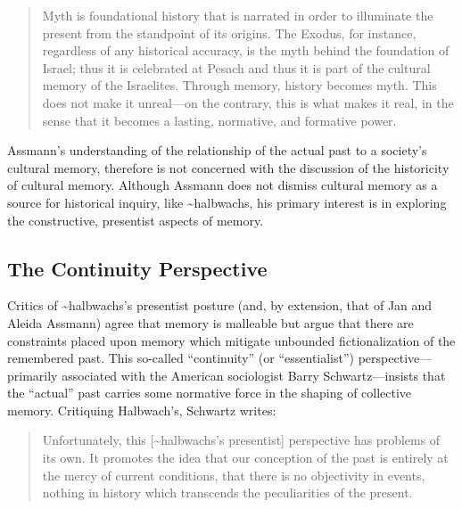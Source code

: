 \begin{quote}
Myth is foundational history that is narrated in order to illuminate the
present from the standpoint of its origins. The Exodus, for instance,
regardless of any historical accuracy, is the myth behind the foundation
of Israel; thus it is celebrated at Pesach and thus it is part of the
cultural memory of the Israelites. Through memory, history becomes myth.
This does not make it unreal---on the contrary, this is what makes it
real, in the sense that it becomes a lasting, normative, and formative
power.\autocite[38]{assmann2011}
\end{quote}

Assmann's understanding of the relationship of the actual past to a
society's cultural memory, therefore is not concerned with the
discussion of the historicity of cultural memory. Although Assmann does
not dismiss cultural memory as a source for historical inquiry, like
\textasciitilde{}halbwachs, his primary interest is in exploring the
constructive, presentist aspects of memory.

\hypertarget{the-continuity-perspective}{%
\subsection{The Continuity
Perspective}\label{the-continuity-perspective}}

Critics of \textasciitilde{}halbwachs's presentist posture (and, by
extension, that of Jan and Aleida Assmann) agree that memory is
malleable but argue that there are constraints placed upon memory which
mitigate unbounded fictionalization of the remembered past. This
so-called ``continuity'' (or ``essentialist'') perspective---primarily
associated with the American sociologist Barry Schwartz---insists that
the ``actual'' past carries some normative force in the shaping of
collective memory.\autocites[Schwartz has made numerous contributions to
the field of memory studies. See
esp.][]{schwartz_sf1982}{schwartz_asr1991}[and][]{schwartz2000}[Note
also the SBL volume specifically interacting with his
work:][]{thatcher2014} Critiquing Halbwach's, Schwartz writes:

\begin{quote}
Unfortunately, this {[}\textasciitilde{}halbwachs's presentist{]}
perspective has problems of its own. It promotes the idea that our
conception of the past is entirely at the mercy of current conditions,
that there is no objectivity in events, nothing in history which
transcends the peculiarities of the
present.\autocite[376]{schwartz_sf1982}
\end{quote}

